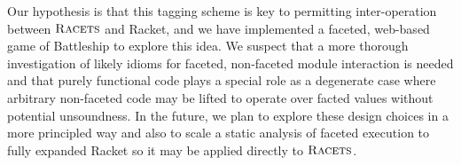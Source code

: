 \documentclass[review=true,acmlarge]{acmart}
\newcommand{\racets}[0]{$\textsc{Racets}$\xspace}
\begin{document}
Our hypothesis is that this tagging scheme is key to permitting inter-operation
between \racets and Racket, and we have implemented a faceted, web-based game of Battleship
to explore this idea. We suspect that a more thorough investigation of likely idioms
for faceted, non-faceted module interaction is needed and that purely functional code
plays a special role as a degenerate case where arbitrary non-faceted code may be lifted
to operate over facted values without potential unsoundness. In the future, we plan to explore
these design choices in a more principled way and also to scale a static analysis \cite{Micinski:2019}
of faceted execution to fully expanded Racket so it may be applied directly to \racets.





\end{document}
